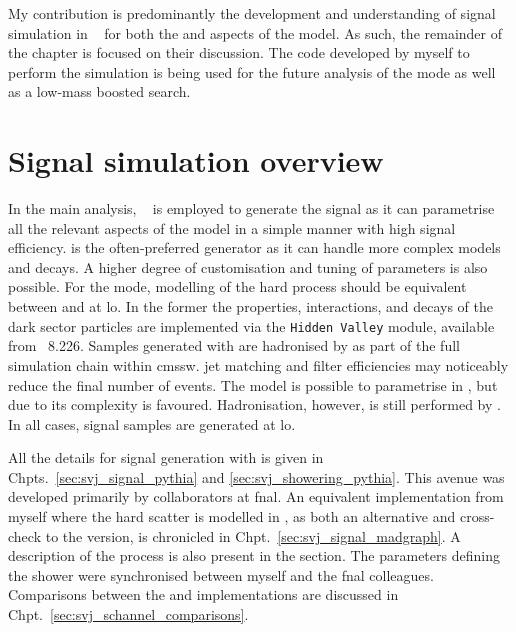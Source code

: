 My contribution is predominantly the development and understanding of signal simulation in \MGvATNLO~\cite{Alwall:2011madgraph} for both the \schannel and \tchannel aspects of the model. As such, the remainder of the chapter is focused on their discussion. The code developed by myself to perform the simulation is being used for the future analysis of the \tchannel mode as well as a low-mass boosted \PZprime search.




\section{Signal simulation overview}
\label{sec:signal_sim}

In the main analysis, \PYTHIAEIGHT~\cite{pythia82} is employed to generate the \schannel signal as it can parametrise all the relevant aspects of the model in a simple manner with high signal efficiency. \MADGRAPH is the often-preferred generator as it can handle more complex models and decays. A higher degree of customisation and tuning of parameters is also possible. For the \schannel mode, modelling of the hard process should be equivalent between \PYTHIA and \MADGRAPH at \acrfull{lo}. In the former the properties, interactions, and decays of the dark sector particles are implemented via the \texttt{Hidden Valley} module, available from \PYTHIA~8.226. Samples generated with \MADGRAPH are hadronised by \PYTHIA as part of the full simulation chain within \acrshort{cmssw}. \Gls{jet} matching and filter efficiencies may noticeably reduce the final number of events. The \tchannel model is possible to parametrise in \PYTHIA, but due to its complexity \MADGRAPH is favoured. Hadronisation, however, is still performed by \PYTHIA. In all cases, signal samples are generated at \acrshort{lo}.

All the details for \schannel signal generation with \PYTHIAEIGHT is given in Chpts.~\ref{sec:svj_signal_pythia} and \ref{sec:svj_showering_pythia}. This avenue was developed primarily by collaborators at \acrshort{fnal}. An equivalent implementation from myself where the hard scatter is modelled in \MGvATNLO, as both an alternative and cross-check to the \PYTHIA version, is chronicled in Chpt.~\ref{sec:svj_signal_madgraph}. A description of the \tchannel process is also present in the section. The parameters defining the shower were synchronised between myself and the \acrshort{fnal} colleagues. Comparisons between the \PYTHIA and \MADGRAPH implementations are discussed in Chpt.~\ref{sec:svj_schannel_comparisons}.

